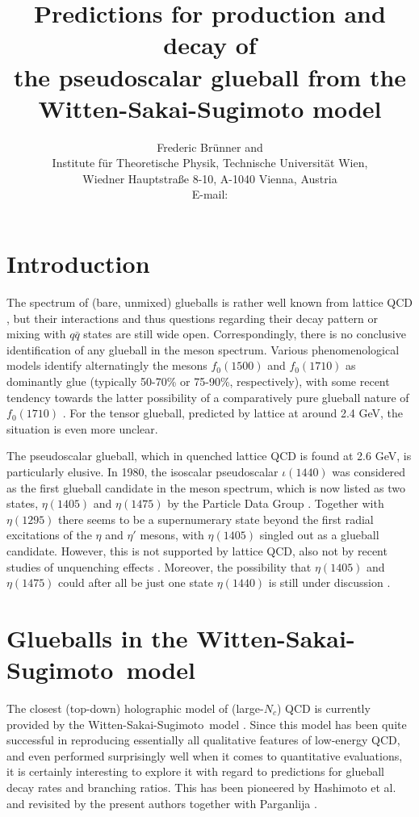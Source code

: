 \documentclass[a4paper]{PoS}
\title{Predictions for production and decay of\\ the pseudoscalar glueball from the Witten-Sakai-Sugimoto model}
\author{Frederic Br\"unner and \speaker{Anton Rebhan}\\%
       Institute f\"ur Theoretische Physik, Technische Universit\"at Wien,\\ Wiedner Hauptstra{\ss}e 8-10, A-1040 Vienna, Austria\\
        E-mail: \email{bruenner,rebhana @hep.itp.tuwien.ac.at}}
\newcommand{\6}{\partial }
\newcommand{\8}{T_{\rm D8}}
\def\PDG{\cite{PDG16}}
\def\WSS{Witten-Sakai-Sugimoto}
\begin{document}
\section{Introduction}

The spectrum of (bare, unmixed) glueballs is rather well known from lattice QCD \cite{Morningstar:1999rf%
}, but their interactions
and thus questions regarding their decay pattern or mixing with $q\bar q$ states are still wide open.
Correspondingly, there is no conclusive identification of any glueball in the meson spectrum.
Various phenomenological models identify alternatingly the mesons $f_0(1500)$ and $f_0(1710)$ as
dominantly glue (typically 50-70\% or 75-90\%, respectively), with some recent tendency towards the
latter possibility of a comparatively pure glueball nature of $f_0(1710)$ \cite{Cheng:2015iaa}. For the tensor glueball,
predicted by lattice at around 2.4 GeV, the situation is even more unclear.

The pseudoscalar glueball, which in quenched lattice QCD is found at 2.6 GeV, is particularly elusive.
In 1980, the isoscalar pseudoscalar $\iota(1440)$ was considered as the first glueball candidate in the
meson spectrum, which is now listed as two states, $\eta(1405)$ and $\eta(1475)$ by the Particle Data Group \PDG.
Together with $\eta(1295)$ there seems to be a supernumerary state beyond the first radial excitations
of the $\eta$ and $\eta'$ mesons, with $\eta(1405)$ singled out as a glueball candidate. However, this
is not supported by lattice QCD, also not by recent studies of unquenching effects \cite{Sun:2017ipk}. Moreover, the possibility
that $\eta(1405)$ and $\eta(1475)$ could after all be just one state $\eta(1440)$ is still under discussion \cite{Crede:2008vw}.

\section{Glueballs in the \WSS\ model}

The closest (top-down) holographic model of (large-$N_c$) QCD is currently provided by the \WSS\ model \cite{%
Sakai:2004cn%
}.
Since this model has been quite successful in reproducing essentially all qualitative features of low-energy QCD,
and even performed surprisingly well when it comes to quantitative evaluations, it is certainly interesting
to explore it with regard to predictions for glueball decay rates and branching ratios.
This has been pioneered by Hashimoto et al.\ \cite{Hashimoto:2007ze} and revisited by the present authors together with Parganlija
\cite{Brunner:2015oqa,1504.05815,1510.07605,Brunner:2016ygk}.
\end{document}
